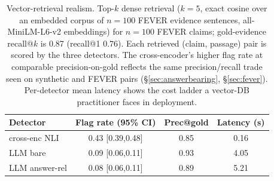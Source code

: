 \begin{table}[t]
\centering
\small
\begin{tabular}{lccc}
\toprule
Detector & Flag rate (95\% CI) & Prec@gold & Latency (s) \\
\midrule
cross-enc NLI & 0.43 [0.39,0.48] & 0.85 & 0.16 \\
LLM bare & 0.09 [0.06,0.11] & 0.93 & 4.05 \\
LLM answer-rel & 0.08 [0.06,0.11] & 0.89 & 5.21 \\
\bottomrule
\end{tabular}
\caption{Vector-retrieval realism. Top-$k$ dense retrieval ($k=5$, exact cosine over
an embedded corpus of $n=100$ FEVER evidence sentences, all-MiniLM-L6-v2
embeddings) for $n=100$ FEVER claims; gold-evidence recall@$k$ is
0.87 (recall@1 $0.76$). Each retrieved (claim, passage) pair is
scored by the three detectors. The cross-encoder's higher flag rate at comparable
precision-on-gold reflects the same precision/recall trade seen on synthetic and FEVER
pairs (\S\ref{sec:answerbearing}, \S\ref{sec:fever}). Per-detector mean latency
shows the cost ladder a vector-DB practitioner faces in deployment.}
\label{tab:retrieval_realism}
\end{table}
